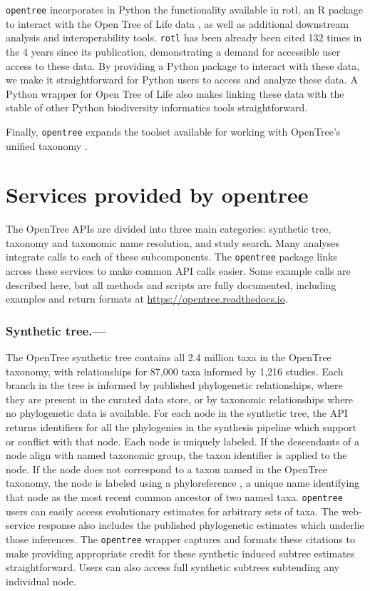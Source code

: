 \documentclass[oupdraft]{sysbio_sse}
\begin{document}
\texttt{opentree} incorporates in Python the functionality available in rotl, an {R} package to interact with the Open Tree of Life data \citep{michonneau_rotl_2016}, as well as additional downstream analysis and interoperability tools.
\texttt{rotl} has been already been cited 132 times in the 4 years since its publication, demonstrating a demand for accessible user access to these data.
By providing a Python package to interact with these data, we make it straightforward for Python users to access and analyze these data.
A Python wrapper for Open Tree of Life also makes linking these data with the stable of other Python biodiversity informatics tools straightforward.

Finally, \texttt{opentree} expands the toolset available for working with OpenTree's unified taxonomy \citep{rees_automated_2017}.


\bigskip
\section{Services provided by opentree}
\label{sec3}


The OpenTree APIs are divided into three main categories: synthetic tree, taxonomy and taxonomic name resolution, and study search.
Many analyses integrate calls to each of these subcomponents.
The \texttt{opentree} package links across these services to make common API calls easier.
Some example calls are described here, but all methods and scripts are fully documented, including examples and return formats at \url{https://opentree.readthedocs.io}.

\subsubsection{Synthetic tree.---} The OpenTree synthetic tree contains all 2.4 million taxa in the OpenTree taxonomy, with relationships for 87,000 taxa informed by 1,216 studies.
Each branch in the tree is informed by published phylogenetic relationships, where they are present in the curated data store, or by taxonomic relationships where no phylogenetic data is available.
For each node in the synthetic tree, the API returns identifiers for
all the phylogenies in the synthesis pipeline which support or conflict with that node.
Each node is uniquely labeled.
If the descendants of a node align with named taxonomic group, the taxon identifier is applied to the node.
If the node does not correspond to a taxon named in the OpenTree taxonomy, the node is labeled using a phyloreference \citep{parr_evolutionary_2012}, a unique name identifying that node as the most recent common ancestor of two named taxa.
\texttt{opentree} users can easily access evolutionary estimates for arbitrary sets of taxa.
The web-service response also includes the published phylogenetic estimates which underlie those inferences.
The \texttt{opentree} wrapper captures and formats these citations to make providing appropriate credit for these synthetic induced subtree estimates straightforward.
Users can also access full synthetic subtrees subtending any individual node.
\end{document}
